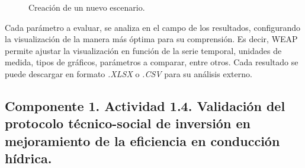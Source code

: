 \documentclass[]{article}
\begin{document}
\begin{itemize}
\begin{figure}[H]
\begin{center}
\caption{Creación de un nuevo escenario.}
\label{etiqueta_figura7}
\end{center}
\end{figure}

Cada parámetro a evaluar, se analiza en el campo de los resultados, configurando la visualización de la manera más óptima para su comprensión. Es decir, WEAP permite ajustar la visualización en función de la serie temporal, unidades de medida, tipos de gráficos, parámetros a comparar, entre otros. Cada resultado se puede descargar en formato \textit{.XLSX} o \textit{.CSV} para su análisis externo. 

\end{itemize}

\subsection{Componente 1. Actividad 1.4. Validación del protocolo técnico-social de inversión en mejoramiento de la eficiencia en conducción hídrica.}
\end{document}
